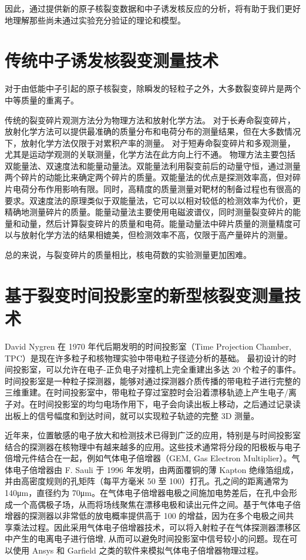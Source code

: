 \documentclass[AutoFakeBold]{LZUThesis}
\begin{document}
因此，通过提供新的原子核裂变数据和中子诱发核反应的分析，将有助于我们更好地理解那些尚未通过实验充分验证的理论和模型\cite{bohr1939mechanism}。





\section{传统中子诱发核裂变测量技术}
对于由低能中子引起的原子核裂变，除瞬发的轻粒子之外，大多数裂变碎片是两个中等质量的重离子。

传统的裂变碎片观测方法分为物理方法和放射化学方法。
对于长寿命裂变碎片，放射化学方法可以提供最准确的质量分布和电荷分布的测量结果，但在大多数情况下，放射化学方法仅限于对累积产率的测量。
对于短寿命裂变碎片和多观测量，尤其是运动学观测的关联测量，化学方法在此方向上行不通。
物理方法主要包括双能量法、双速度法和能量动量法。双能量法利用裂变前后的动量守恒，通过测量两个碎片的动能比来确定两个碎片的质量。双能量法的优点是探测效率高，但对碎片电荷分布作用影响有限。同时，高精度的质量测量对靶材的制备过程也有很高的要求。双速度法的原理类似于双能量法，它可以以相对较低的检测效率为代价，更精确地测量碎片的质量。能量动量法主要使用电磁波谱仪，同时测量裂变碎片的能量和动量，然后计算裂变碎片的质量和电荷。能量动量法中碎片质量的测量精度可以与放射化学方法的结果相媲美，但检测效率不高，仅限于高产量碎片的测量。

总的来说，与裂变碎片的质量相比，核电荷数的实验测量更加困难。






\section{基于裂变时间投影室的新型核裂变测量技术}
David Nygren 在 1970 年代后期发明的时间投影室（Time Projection Chamber, TPC）是现在许多粒子和核物理实验中带电粒子径迹分析的基础\cite{nygren1978time}。
最初设计的时间投影室，可以允许在电子-正负电子对撞机上完全重建出多达 20 个粒子的事件。
时间投影室是一种粒子探测器，能够对通过探测器介质传播的带电粒子进行完整的三维重建。在时间投影室中，带电粒子穿过室腔时会沿着漂移轨迹上产生电子/离子对。在时间投影室的均匀电场作用下，电子会向读出板上移动，之后通过记录读出板上的信号幅度和到达时间，就可以实现粒子轨迹的完整 3D 测量。

近年来，位置敏感的电子放大和检测技术已得到广泛的应用，特别是与时间投影室结合的探测器在核物理中有越来越多的应用。这些技术通常将分段的阳极板与电子倍增元件结合在一起，例如气体电子倍增器（GEM, Gas Electron Multiplier）\cite{fenker2008bonus, sauli2016gas}。气体电子倍增器由 F. Sauli 于 1996 年发明，由两面覆铜的薄 Kapton 绝缘箔组成，并由高密度规则的孔矩阵（每平方毫米 50 至 100）打孔。孔之间的距离通常为 140μm，直径约为 70μm。在气体电子倍增器电极之间施加电势差后，在孔中会形成一个高偶极子场，从而将场线聚焦在漂移电极和读出元件之间。基于气体电子倍增器的探测器以非常低的放电概率提供高于 100 的增益，因为在多个电极之间共享乘法过程。因此采用气体电子倍增器技术，可以将入射粒子在气体探测器漂移区中产生的电离电子进行倍增, 从而可以避免时间投影室中信号较小的问题。现在可以使用 Ansys 和 Garfield 之类的软件来模拟气体电子倍增器物理过程。
\end{document}
